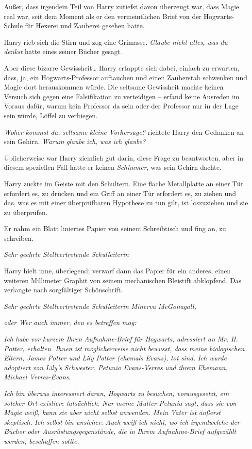 {Außer, dass irgendein Teil von Harry zutiefst davon überzeugt war, dass Magie real war, seit dem Moment als er den vermeintlichen Brief von der Hogwarts-Schule für Hexerei und Zauberei gesehen hatte.

Harry rieb sich die Stirn und zog eine Grimasse. \emph{Glaube nicht alles, was du denkst} hatte eines seiner Bücher gesagt.

Aber diese bizarre Gewissheit… Harry ertappte sich dabei, einfach zu erwarten, dass, ja, ein Hogwarts-Professor auftauchen und einen Zauberstab schwenken und Magie dort herauskommen würde. Die seltsame Gewissheit machte keinen Versuch sich gegen eine Falsifikation zu verteidigen -- erfand keine Ausreden im Voraus dafür, warum kein Professor da sein oder der Professor nur in der Lage sein würde, Löffel zu verbiegen.

\emph{Woher kommst du, seltsame kleine Vorhersage?} richtete Harry den Gedanken an sein Gehirn. \emph{Warum glaube ich, was ich glaube?}

Üblicherweise war Harry ziemlich gut darin, diese Frage zu beantworten, aber in diesem speziellen Fall hatte er keinen \emph{Schimmer,} was sein Gehirn dachte.

Harry zuckte im Geiste mit den Schultern. Eine flache Metallplatte an einer Tür erfordert es, zu drücken und ein Griff an einer Tür erfordert es, zu ziehen und das, was es mit einer überprüfbaren Hypothese zu tun gilt, ist loszuziehen und sie zu überprüfen.

Er nahm ein Blatt liniertes Papier von seinem Schreibtisch und fing an, zu schreiben.

\emph{Sehr geehrte Stellvertretende Schulleiterin}

Harry hielt inne, überlegend; verwarf dann das Papier für ein anderes, einen weiteren Millimeter Graphit von seinem mechanischen Bleistift abklopfend. Das verlangte nach sorgfältiger Schönschrift.

\emph{Sehr geehrte Stellvertretende Schulleiterin Minerva McGonagall,}

\emph{oder Wer auch immer, den es betreffen mag:}

\emph{Ich habe vor kurzem Ihren Aufnahme-Brief für Hogwarts, adressiert an} \emph{Mr. H. Potter, erhalten. Ihnen ist möglicherweise nicht bewusst, dass meine biologischen Eltern, James Potter und Lily Potter (ehemals Evans), tot sind. Ich wurde adoptiert von Lily's Schwester, Petunia Evans-Verres und ihrem Ehemann, Michael Verres-Evans.}

\emph{Ich bin überaus interessiert daran, Hogwarts zu besuchen, vorausgesetzt, ein solcher Ort existiere tatsächlich. Nur meine Mutter Petunia sagt, dass sie von Magie weiß, kann sie aber nicht selbst anwenden. Mein Vater ist äußerst skeptisch. Ich selbst bin unsicher. Auch weiß ich nicht, wo ich irgendwelche der Bücher oder Ausrüstungsgegenstände, die in Ihrem Aufnahme-Brief aufgezählt werden, beschaffen sollte.}

}
